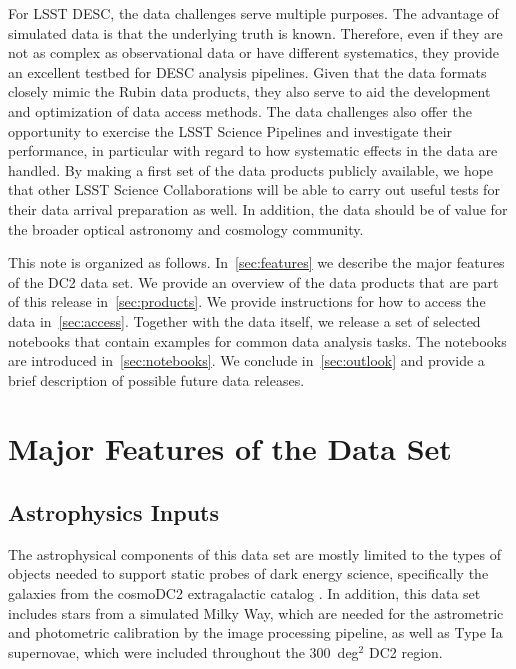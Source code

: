 \documentclass[modern]{descnote}
\begin{document}
For LSST DESC, the data challenges serve multiple purposes. The advantage of simulated data is that the underlying truth is known. Therefore, even if they are not as complex as observational data or have different systematics, they provide an excellent testbed for DESC analysis pipelines. Given that the data formats closely mimic the Rubin data products, they also serve to aid the development and optimization of data access methods. The data challenges also offer the opportunity to exercise the LSST Science Pipelines and investigate their performance, in particular with regard to how systematic effects in the data are handled. By making a first set of the data products publicly available, we hope that other LSST Science Collaborations will be able to carry out useful tests for their data arrival preparation as well. In addition, the data should be of value for the broader optical astronomy and cosmology community.

This note is organized as follows. In~\autoref{sec:features} we describe the major features of the DC2 data set. We provide an overview of the data products that are part of this release in~\autoref{sec:products}. We provide instructions for how to access the data in~\autoref{sec:access}. Together with the data itself, we release a set of selected notebooks that contain examples for common data analysis tasks. The notebooks are introduced in~\autoref{sec:notebooks}.
We conclude in~\autoref{sec:outlook} and provide a brief description of possible future data releases. 

\section{Major Features of the Data Set}
\label{sec:features}

\subsection{Astrophysics Inputs}

The astrophysical components of this data set are mostly limited to the types of objects needed to support static probes of dark energy science, specifically the galaxies from the cosmoDC2 extragalactic catalog \citep{korytov}.  In addition, this data set includes stars from a simulated Milky Way, which are needed for the astrometric and photometric calibration by the image processing pipeline, as well as Type Ia supernovae, which were included throughout the 300~deg$^2$ DC2 region.
\end{document}
